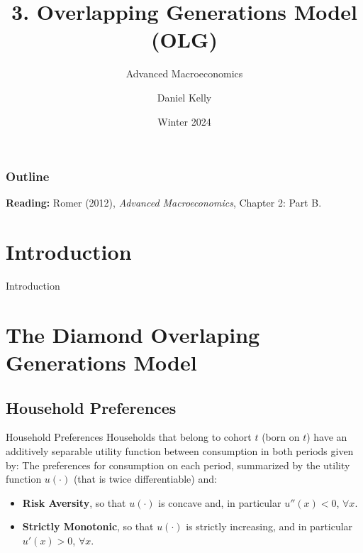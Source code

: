 \documentclass[10pt,usenames,dvipsnames]{beamer}
\title{\textbf{3. Overlapping Generations Model (OLG)}}
\subtitle{Advanced Macroeconomics}
\author[Daniel Kelly (Colmex)]{Daniel Kelly}
\institute[Colmex]{El Colegio de México}
\date{Winter 2024}
\begin{document}
\begin{frame}[plain]
    \titlepage
\end{frame}

{
\begin{frame}[plain]
    \frametitle{Outline}
    \tableofcontents
\end{frame}
}

\begin{frame}[plain]
\textbf{Reading:} Romer (2012), \textit{Advanced Macroeconomics}, Chapter 2: Part B.
\end{frame}

\section{Introduction}

\begin{frame}{Introduction}

\end{frame}

\section{The Diamond Overlaping Generations Model}



\subsection{Household Preferences}
\begin{frame}{Household Preferences}
Households that belong to cohort $t$ (born on $t$) have an \alert{additively separable} utility function between consumption in both periods given by:
\pause
The preferences for consumption on each period, summarized by the utility function $u(\cdot)$ (that is twice differentiable) and:
\begin{itemize}
\item \textbf{Risk Aversity}, so that $u(\cdot)$ is concave and, in particular $u''(x)<0$, $\forall x$.
\item \textbf{Strictly Monotonic}, so that $u(\cdot)$ is strictly increasing, and in particular $u'(x)>0$, $\forall x$.
\end{itemize}
\end{frame}
\end{document}
